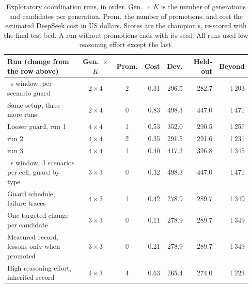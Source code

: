 \begin{table}[tb]
  \centering
  \caption{Exploratory coordination runs, in order. Gen.\ $\times$ $K$ is the
    number of generations and candidates per generation, Prom.\ the number of
    promotions, and cost the estimated DeepSeek cost in US dollars. Scores
    are the champion's, re-scored with the final test bed. A run without
    promotions ends with its seed. All runs used low reasoning effort except
    the last.}
  \label{tab:coord-runs}
  \small\setlength{\tabcolsep}{4pt}
  \begin{tabular}{@{}>{\raggedright\arraybackslash}p{}ccrrrr@{}}
    \toprule
    Run (change from the row above) & Gen.\ $\times$ $K$ & Prom. & Cost
      & Dev. & Held-out & Beyond \\
    \midrule
    50~s window, per-scenario guard            & $2 \times 4$ & 2 & 0.31 & 296.5 & 282.7 & 1\,203 \\
    Same setup, three more runs                & $2 \times 4$ & 0 & 0.83 & 498.3 & 447.0 & 1\,471 \\
    Looser guard, run 1                        & $4 \times 4$ & 1 & 0.53 & 352.0 & 290.5 & 1\,257 \\
    \phantom{Looser guard,} run 2              & $4 \times 4$ & 2 & 0.35 & 291.5 & 291.6 & 1\,231 \\
    \phantom{Looser guard,} run 3              & $4 \times 4$ & 1 & 0.40 & 417.3 & 396.8 & 1\,345 \\
    600~s window, 3 scenarios per cell, guard by type
                                               & $3 \times 3$ & 0 & 0.32 & 498.3 & 447.0 & 1\,471 \\
    Guard schedule, failure traces             & $4 \times 3$ & 1 & 0.42 & 278.9 & 289.7 & 1\,349 \\
    One targeted change per candidate          & $3 \times 3$ & 0 & 0.11 & 278.9 & 289.7 & 1\,349 \\
    Measured record, lessons only when promoted & $3 \times 3$ & 0 & 0.21 & 278.9 & 289.7 & 1\,349 \\
    High reasoning effort, inherited record    & $4 \times 3$ & 4 & 0.63 & 265.4 & 274.0 & 1\,223 \\
    \bottomrule
  \end{tabular}
\end{table}


